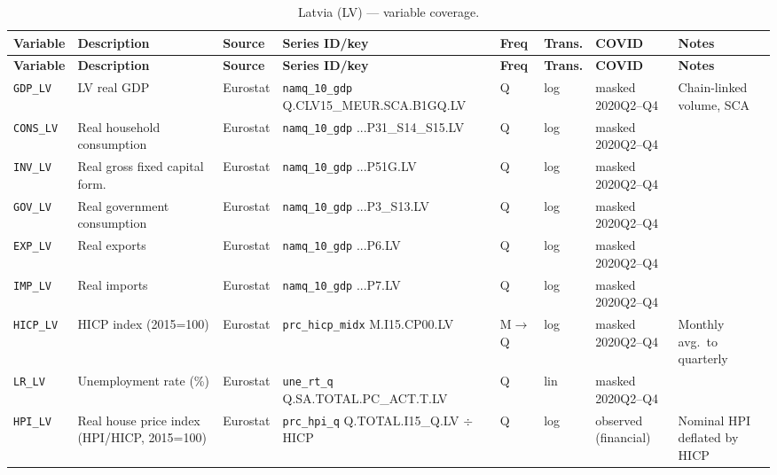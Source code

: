 {\footnotesize
\begin{longtable}{@{}p{1.9cm}p{2.9cm}p{1.5cm}p{2.7cm}p{0.7cm}p{1.0cm}p{1.6cm}p{2.4cm}@{}}
\caption{Latvia (LV) --- variable coverage.}\label{tab:data:LV}\\
\toprule
\textbf{Variable} & \textbf{Description} & \textbf{Source} & \textbf{Series ID/key} & \textbf{Freq} & \textbf{Trans.} & \textbf{COVID} & \textbf{Notes} \\
\midrule \endfirsthead
\toprule
\textbf{Variable} & \textbf{Description} & \textbf{Source} & \textbf{Series ID/key} & \textbf{Freq} & \textbf{Trans.} & \textbf{COVID} & \textbf{Notes} \\
\midrule \endhead
\bottomrule \endfoot
\texttt{GDP\_LV}      & LV real GDP                       & Eurostat & \texttt{namq\_10\_gdp} Q.\allowbreak CLV15\_MEUR.\allowbreak SCA.\allowbreak B1GQ.\allowbreak LV       & Q & log & masked 2020Q2--Q4 & Chain-linked volume, SCA \\
\texttt{CONS\_LV}     & Real household consumption        & Eurostat & \texttt{namq\_10\_gdp} ...P31\_S14\_S15.LV             & Q & log & masked 2020Q2--Q4 & \\
\texttt{INV\_LV}      & Real gross fixed capital form.    & Eurostat & \texttt{namq\_10\_gdp} ...P51G.LV                      & Q & log & masked 2020Q2--Q4 & \\
\texttt{GOV\_LV}      & Real government consumption       & Eurostat & \texttt{namq\_10\_gdp} ...P3\_S13.LV                   & Q & log & masked 2020Q2--Q4 & \\
\texttt{EXP\_LV}      & Real exports                      & Eurostat & \texttt{namq\_10\_gdp} ...P6.LV                        & Q & log & masked 2020Q2--Q4 & \\
\texttt{IMP\_LV}      & Real imports                      & Eurostat & \texttt{namq\_10\_gdp} ...P7.LV                        & Q & log & masked 2020Q2--Q4 & \\
\texttt{HICP\_LV}     & HICP index (2015=100)             & Eurostat & \texttt{prc\_hicp\_midx} M.I15.CP00.LV                 & M$\to$Q & log & masked 2020Q2--Q4 & Monthly avg.\ to quarterly \\
\texttt{LR\_LV}       & Unemployment rate (\%)            & Eurostat & \texttt{une\_rt\_q} Q.SA.TOTAL.PC\_ACT.T.LV            & Q & lin & masked 2020Q2--Q4 & \\
\texttt{HPI\_LV}      & Real house price index (HPI/HICP, 2015=100) & Eurostat & \texttt{prc\_hpi\_q} Q.TOTAL.I15\_Q.LV $\div$ HICP & Q & log & observed (financial) & Nominal HPI deflated by HICP \\

\end{longtable}}
